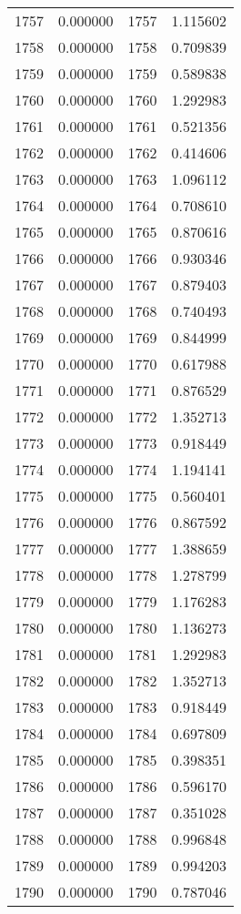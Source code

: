 \documentclass[12pt]{article}
\begin{document}
\begin{longtable}{@{}cccc@{}}
1757 & 0.000000 & 1757 & 1.115602 \\
1758 & 0.000000 & 1758 & 0.709839 \\
1759 & 0.000000 & 1759 & 0.589838 \\
1760 & 0.000000 & 1760 & 1.292983 \\
1761 & 0.000000 & 1761 & 0.521356 \\
1762 & 0.000000 & 1762 & 0.414606 \\
1763 & 0.000000 & 1763 & 1.096112 \\
1764 & 0.000000 & 1764 & 0.708610 \\
1765 & 0.000000 & 1765 & 0.870616 \\
1766 & 0.000000 & 1766 & 0.930346 \\
1767 & 0.000000 & 1767 & 0.879403 \\
1768 & 0.000000 & 1768 & 0.740493 \\
1769 & 0.000000 & 1769 & 0.844999 \\
1770 & 0.000000 & 1770 & 0.617988 \\
1771 & 0.000000 & 1771 & 0.876529 \\
1772 & 0.000000 & 1772 & 1.352713 \\
1773 & 0.000000 & 1773 & 0.918449 \\
1774 & 0.000000 & 1774 & 1.194141 \\
1775 & 0.000000 & 1775 & 0.560401 \\
1776 & 0.000000 & 1776 & 0.867592 \\
1777 & 0.000000 & 1777 & 1.388659 \\
1778 & 0.000000 & 1778 & 1.278799 \\
1779 & 0.000000 & 1779 & 1.176283 \\
1780 & 0.000000 & 1780 & 1.136273 \\
1781 & 0.000000 & 1781 & 1.292983 \\
1782 & 0.000000 & 1782 & 1.352713 \\
1783 & 0.000000 & 1783 & 0.918449 \\
1784 & 0.000000 & 1784 & 0.697809 \\
1785 & 0.000000 & 1785 & 0.398351 \\
1786 & 0.000000 & 1786 & 0.596170 \\
1787 & 0.000000 & 1787 & 0.351028 \\
1788 & 0.000000 & 1788 & 0.996848 \\
1789 & 0.000000 & 1789 & 0.994203 \\
1790 & 0.000000 & 1790 & 0.787046 \\

\end{longtable}
\end{document}
